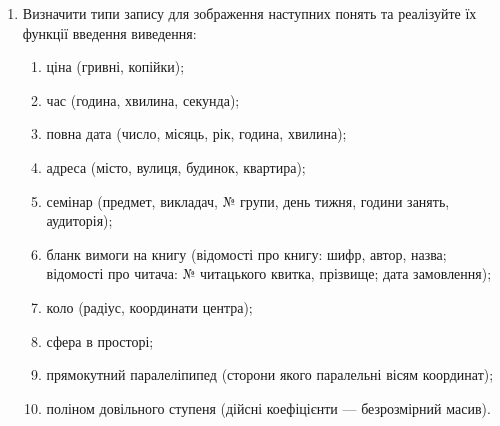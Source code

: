 \documentclass[]{article}
\makeatletter
\newcommand{\xslalph}[1]{\expandafter\@xslalph\csname c@#1\endcsname}
\newcommand{\@xslalph}[1]{%
    \ifcase#1\or а\or б\or в\or г\or д\or e\or є\or ж\or з\or i%
    \or й\or к\or л\or м\or н\or о\or п\or р\or с\or т%
    \or у\or ф\or х\or ц\or ч\or ш\or ю\or я\or аа\or бб\or вв%
    \else\@ctrerr\fi%
}
\makeatother
\begin{document}
\begin{enumerate}
\begin{enumerate}[label=\xslalph*)]
\begin{enumerate}
\begin{enumerate}[label=\xslalph*)]
\begin{enumerate}
\def\labelenumi{\arabic{enumi})}
\setcounter{enumi}{5}
\item
 Визначити типи запису для зображення наступних понять та реалізуйте
їх функції введення виведення:
\begin{enumerate}[label=\xslalph*)]
\item ціна (гривні, копійки);
\item час (година, хвилина, секунда);
\item повна дата (число, місяць, рік, година, хвилина);
\item адреса (місто, вулиця, будинок, квартира);
\item семінар (предмет, викладач, № групи, день тижня, години занять, аудиторія);
\item бланк вимоги на книгу (відомості про книгу: шифр, автор, назва;
відомості про читача: № читацького квитка, прізвище; дата замовлення);
\item коло (радіус, координати центра);
\item сфера в просторі;
\item прямокутний паралеліпипед (сторони якого паралельні вісям координат);
\item поліном довільного ступеня (дійсні коефіцієнти --- безрозмірний
масив).

\end{enumerate}


\end{enumerate}
\end{enumerate}
\end{enumerate}
\end{enumerate}
\end{enumerate}
\end{document}

